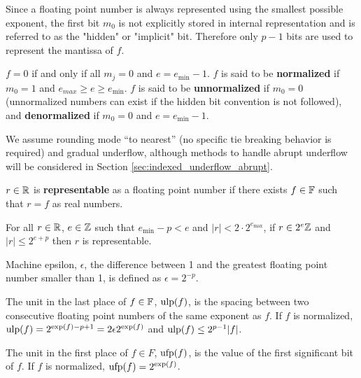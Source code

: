   Since a floating point number is always represented using the smallest possible
  exponent, the first bit $m_0$ is not explicitly stored in internal representation
  and is referred to as the "hidden" or "implicit" bit.
  Therefore only $p-1$ bits are used to represent the mantissa of $f$.

  $f = 0$ if and only if all $m_j = 0$ and $e = e_{\min} - 1$.
  $f$ is said to be \textbf{normalized} if $m_0 =1$
  and $e_{max} \geq e \geq e_{\min}$.
  $f$ is said to be \textbf{unnormalized} if $m_0 = 0$ (unnormalized numbers can 
  exist if the hidden bit convention is not followed), and
  \textbf{denormalized} if $m_0 = 0$ and $e = e_{\min} - 1$.

  \begin{comment}
  In binary internal representation, $f=0$ is represented by a biased exponent of $0$
  as well as a mantissa field of all 0-bits.
  Denormalized numbers have biased exponent of $0$ and non-zero mantissa field.
  An exponent field of all 1-bits and a mantissa field of all 0-bits
  represent infinities, positive or negative depending on the sign bit.
  An exponent field of all 1-bits and a non-zero mantissa field
  represent a NaN value.
  \end{comment}

  We assume rounding mode ``to nearest'' (no specific tie
  breaking behavior is required) and gradual underflow, although
  methods to handle abrupt underflow will be considered in Section
  \ref{sec:indexed_underflow_abrupt}.

  $r \in \mathbb{R}$ is \textbf{representable} as a floating point number if there
  exists $f \in \mathbb{F}$ such that $r = f$ as real numbers.

  For all $r \in \mathbb{R}$, $e \in \mathbb{Z}$ such that $e_{\min} - p < e$ and $|r| < 2
  \cdot 2^{e_{\max}}$, if $r \in 2^e\mathbb{Z}$ and $|r| \leq 2^{e + p}$ then $r$ is
  representable.

  Machine epsilon, $\epsilon$, the difference between 1 and the greatest
  floating point number smaller than 1, is defined as $\epsilon = 2^{-p}$.

  The unit in the last place of $f \in \mathbb{F}$, $\text{ulp}(f)$, is the spacing between
  two consecutive floating point numbers of the same exponent as $f$. If $f$ is
  normalized, $\text{ulp}(f) = 2^{\text{exp}(f) - p + 1} = 2  \epsilon  2^{\text{exp}(f)}$ and
  $\text{ulp}(f) \leq 2^{p - 1}|f|$.

  The unit in the first place of $f \in F$, $\text{ufp}(f)$, is the value of the
  first significant bit of $f$. If $f$ is normalized, $\text{ufp}(f) = 2^{\text{exp}(f)}$.

